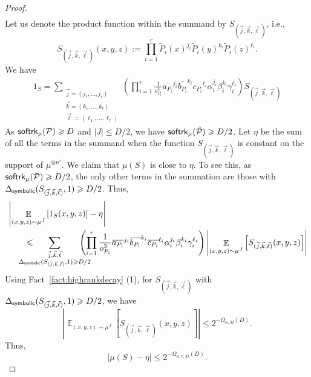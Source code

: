 \documentclass[11pt]{article}
\newcommand\card[1]{\left| {#1} \right|}
\newcommand\Expect[2]{{\mathop{\mathbb{E}}_{#1}\left[ {#2} \right]}}
\renewcommand\geq{\geqslant}
\renewcommand\leq{\leqslant}
\begin{document}
\begin{proof}
\begin{align*}
         \end{align*}
         Let us denote the product function within the summand by $S_{(\vec{j}, \vec{k}, \vec{\ell})}$, i.e., 
     $$ S_{(\vec{j}, \vec{k}, \vec{\ell})}(x, y, z):= \prod_{i=1}^r \tilde{P}_i(x)^{j_i} \tilde{P}_i(y)^{k_i} \tilde{P}_i(z)^{\ell_i}.$$ 
%
We have
\begin{align*}
   1_S = \sum_{\substack{\vec{j} = (j_1, \ldots, j_r) \\ \vec{k} = (k_1, \ldots, k_r) \\ \vec{\ell} = (\ell_1, \ldots, \ell_r)}}
    \left(  \prod_{i=1}^r \frac{1}{o_{P_i}^3}\overline{a_{P_i}}^{j_i} \overline{b_{P_i}}^{k_i} \overline{c_{P_i}}^{\ell_i} \alpha_i^{j_i}\beta_i^{k_i}\gamma_i^{\ell_i} \right)       S_{(\vec{j}, \vec{k}, \vec{\ell})}
\end{align*}
          As  ${\sf softrk}_{\mu}(\mathcal{P})\geq D$ and $|J|\leq D/2$, we have ${\sf softrk}_{\mu}(\tilde{\mathcal{P}})\geq D/2$.  Let $\eta$ be the sum of all the terms in the summand when the function  $S_{(\vec{j}, \vec{k}, \vec{\ell})}$ is constant on the support of $\mu^{\otimes n'}$. We claim that $\mu(S)$ is close to $\eta$. To see this, as ${\sf softrk}_{\mu}(\mathcal{P})\geq D/2$, the only other terms in the summation are those with $\Delta_{{\sf symbolic}}(S_{(\vec{j}, \vec{k}, \vec{\ell})},1)\geq D/2$. Thus,
          \begin{align*}
               &\card{ \Expect{(x, y, z)\sim \mu^{\bar{J}}}{1_S(x, y, z)} -\eta}\\
              & \quad\quad\leq  \hspace{-20pt} \sum_{\substack{\vec{j}, \vec{k}, \vec{\ell} \\\Delta_{{\sf symbolic}}(S_{(\vec{j}, \vec{k}, \vec{\ell})},1)\geq D/2}}\hspace{-15pt}
    \left(  \prod_{i=1}^r \frac{1}{o_{P_i}^3}\overline{a_{P_i}}^{j_i} \overline{b_{P_i}}^{k_i} \overline{c_{P_i}}^{\ell_i} \alpha_i^{j_i}\beta_i^{k_i}\gamma_i^{\ell_i} \right)      \card{\Expect{(x, y, z)\sim \mu^{\bar{J}}}{ S_{(\vec{j}, \vec{k}, \vec{\ell})}(x, y, z)}}
          \end{align*}
          Using Fact~\ref{fact:highrankdecay} (1), for $S_{(\vec{j}, \vec{k}, \vec{\ell})}$ with $\Delta_{{\sf symbolic}}(S_{(\vec{j}, \vec{k}, \vec{\ell})},1)\geq D/2$, we have 
          $$\card{\Expect{(x, y, z)\sim \mu^{\bar{J}}}{ S_{(\vec{j}, \vec{k}, \vec{\ell})}(x, y, z)}}\leq  2^{-\Omega_{\alpha, M}(D)}.$$
          Thus,
          $$\card{ \mu(S) -\eta}\leq 2^{-\Omega_{\alpha,r, M}(D)}.$$

\end{proof}
\end{document}
